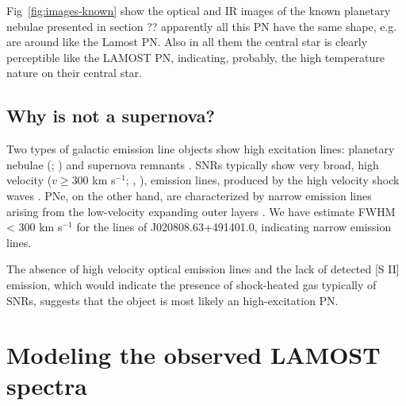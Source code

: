\documentclass[fleqn,usenatbib]{mnras}
\begin{document}
Fig~\ref{fig:images-known} show the optical and IR images of the known planetary nebulae
presented in section ?? apparently all this PN have the same shape, e.g. are around like
the Lamost PN. Also in all them the central star is clearly perceptible like the LAMOST PN,
indicating, probably, the high temperature nature on their central star.

\subsection{Why is not a supernova?}
\label{sec:snr}

Two types of galactic emission line objects show high excitation
lines: planetary nebulae (\citealp{Bernard:2009}; \citealp{Guiles:2007})
and supernova remnants \citep{Sandstrom:2009, Ghavamian:2009}.
SNRs typically show very broad, high velocity ($v \geq 300$ km s$^{-1}$;
\citealp{Oliveira:2011}, \citealp{Fesen:2010}), emission lines, produced by the
high velocity shock waves \citep{Fesen:1985, Fesen:1996, Stupar:2007}. 
PNe, on the other hand, are characterized by narrow emission lines
arising from the low-velocity expanding outer layers \citep{Balick:2002, Gorny:2009}.
We have estimate FWHM < 300 km s$^{-1}$ for the lines of J020808.63+491401.0, indicating
narrow emission lines.

The absence of high velocity optical emission lines and the lack
of detected [S II] emission, which would indicate the presence of shock-heated gas
typically of SNRs, suggests that the object is most likely an high-excitation PN.


\section{Modeling the observed LAMOST spectra}
\label{sec:model}
\end{document}
